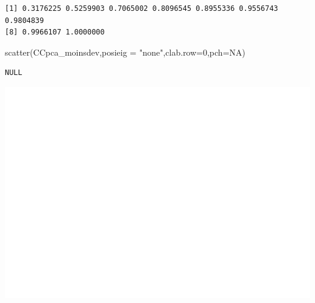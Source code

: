 \documentclass[
]{article}
\newenvironment{Shaded}{}{}
\newcommand{\AttributeTok}[1]{#1}
\newcommand{\ConstantTok}[1]{#1}
\newcommand{\DecValTok}[1]{#1}
\newcommand{\FunctionTok}[1]{#1}
\newcommand{\NormalTok}[1]{#1}
\newcommand{\SpecialCharTok}[1]{\textcolor[rgb]{0.00,0.50,0.50}{#1}}
\newcommand{\StringTok}[1]{\textcolor[rgb]{0.00,0.50,0.50}{#1}}
\begin{document}
\begin{verbatim}
[1] 0.3176225 0.5259903 0.7065002 0.8096545 0.8955336 0.9556743 0.9804839
[8] 0.9966107 1.0000000
\end{verbatim}

\begin{Shaded}
\begin{Highlighting}[]
\FunctionTok{scatter}\NormalTok{(CCpca\_moinsdev,}\AttributeTok{posieig =} \StringTok{"none"}\NormalTok{,}\AttributeTok{clab.row=}\DecValTok{0}\NormalTok{,}\AttributeTok{pch=}\ConstantTok{NA}\NormalTok{)}
\end{Highlighting}
\end{Shaded}

\begin{verbatim}
NULL
\end{verbatim}

\begin{Shaded}
\end{Shaded}

\includegraphics{Projet_files/figure-latex/unnamed-chunk-43-1.pdf}
\end{document}
